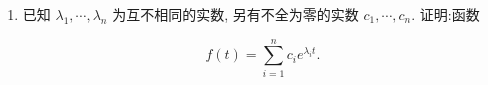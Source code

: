\begin{enumerate}
\begin{solution}
\[        \]
        取定$x_{0}\geq X'$，则
        \[
        \exists X>x_{0},\,\forall x>X:\,\left|\frac{f(x_{0})}{x}\right|<\frac{\epsilon}{2}.
        \]
        应用 Lagrange 定理，则有
        \[
        \begin{aligned}
        \frac{f(x)}{x}&=\left|\frac{f(x_{0})}{x}+\frac{f(x)-f(x_{0})}{x-x_{0}}\cdot \frac{x-x_{0}}{x}\right|\\
        &\leq \left|\frac{f(x_{0})}{x}\right|+\left|\frac{f(x)-f(x_{0})}{x-x_{0}}\right|\cdot\left|\frac{x-x_{0}}{x}\right|\\
        &=\left|\frac{f(x_{0})}{x}\right|+\left|f'(\xi)\right|\cdot \left|\frac{x-x_{0}}{x}\right|<\frac{\epsilon}{2}+\frac{\epsilon}{2}=\epsilon. 
        \end{aligned}
        \]
        故
        \[
        \lim_{x\to +\infty}\frac{f(x)}{x}=0.
        \]
        成立.
    \end{solution}

    \item[4.]已知 $\displaystyle\lambda_{1},\cdots ,\lambda_{n}$ 为互不相同的实数, 另有不全为零的实数 $c_{1},\cdots ,c_{n}$. 证明:函数

    \[\displaystyle f(t) = \sum_{i = 1}^{n}c_{i}e^{\lambda_{i}t}.\]


\end{enumerate}
